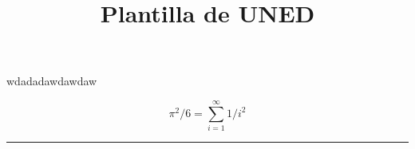 \documentclass[a4paper, ]{article}
\title{\Huge{\vspace{-1em} Plantilla de UNED}}
\author{}
\date{}
\begin{document}
		\maketitle

	\fontsize{12pt}{12pt}\selectfont
	\vspace*{-4em}
		
	
wdadadawdawdaw
	
	\[ \pi^2/6 = \sum_{i = 1}^\infty 1/i^2 \]
	
	 \noindent\rule{\linewidth}{0.4pt}
	 \doclicenseThis
	 
	 
	 
	 
	 
	 
	 
	 
	  	
 	
 	
 	
 	
 	
\end{document}
